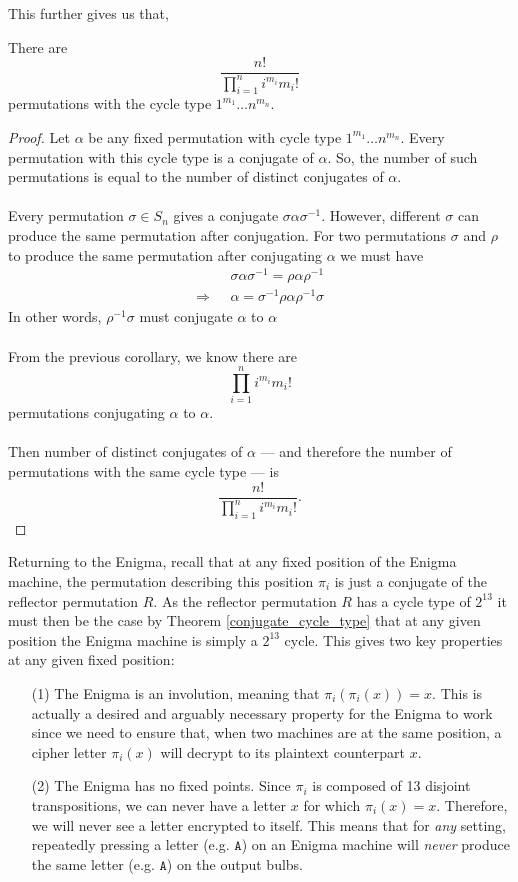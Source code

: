 \noindent This further gives us that,
\begin{corr}\label{cycle_count}
There are
\[
\frac{n!}{\prod_{i=1}^n{i^{m_i}m_i!}}
\]
permutations with the cycle type $1^{m_1}\dots n^{m_n}$.
\end{corr}
\begin{proof}
Let $\alpha$ be any fixed permutation with cycle type $1^{m_1} \dots
n^{m_n}$. Every permutation with this cycle type is a conjugate of
$\alpha$. So, the number of such permutations is equal to the number
of distinct conjugates of $\alpha$.
\\\\Every permutation $\sigma \in S_n$ gives a conjugate $\sigma \alpha
\sigma^{-1}$. However, different $\sigma$ can produce the same permutation
after conjugation. For two permutations $\sigma$ and $\rho$ to produce
the same permutation after conjugating $\alpha$ we must have
\begin{align*}
&\sigma\alpha\sigma^{-1} = \rho\alpha\rho^{-1}\\
\Rightarrow\text{ }&\alpha = \sigma^{-1}\rho\alpha\rho^{-1}\sigma
\end{align*}
In other words, $\rho^{-1}\sigma$ must conjugate $\alpha$ to $\alpha$
\\\\From the previous corollary, we know there are
\[
\prod_{i=1}^{n} i^{m_i} m_i!
\]
permutations conjugating $\alpha$ to $\alpha$.
\\\\Then number of distinct conjugates of $\alpha$ — and therefore
the number of permutations with the same cycle type — is
\[
\frac{n!}{\prod_{i=1}^n i^{m_i} m_i!}.
\]
\end{proof}
\noindent Returning to the Enigma, recall that at any fixed position
of the Enigma machine, the
permutation describing this position $\pi_i$ is just a conjugate
of the reflector permutation $R$. As the reflector permutation $R$
has a cycle type
of $2^{13}$ it must then be the case by Theorem
\ref{conjugate_cycle_type} that at any given position the Enigma
machine is simply a $2^{13}$ cycle. This gives two key properties at
any given fixed position:
\begin{itemize}
\item[(1)] The Enigma is an involution, meaning that $\pi_i(\pi_i(x))
= x$. This is actually a desired and arguably necessary property for
the Enigma to work since we need to ensure that, when two
machines are at the same position, a cipher letter $\pi_i(x)$ will
decrypt to its plaintext counterpart $x$.
\item[(2)] The Enigma has no fixed points. Since $\pi_i$ is composed of
13 disjoint transpositions, we can never have a letter $x$ for which
$\pi_i(x) = x$. Therefore, we will never see a letter encrypted to
itself. This means that for \emph{any} setting, repeatedly pressing a
letter (e.g. $\texttt{A}$) on an Enigma machine
will \emph{never} produce the same letter
(e.g. $\texttt{A}$) on the output bulbs.
\end{itemize}
